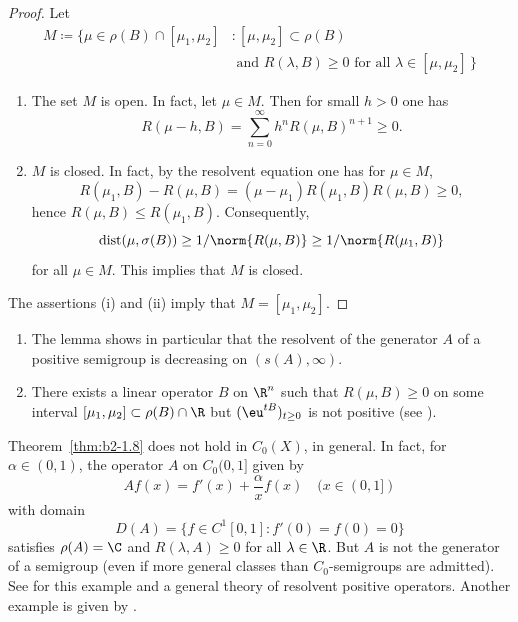 \begin{proof}
Let 
\begin{align*}
M \coloneqq \{\mu \in \rho(B) \cap [\mu_{1},\mu_{2}] &\colon [\mu,\mu_{2}] \subset \rho(B) \\
 &\text{ and } 
R(\lambda,B) \geq 0 \text{ for all } \lambda \in [\mu,\mu_{2}] \,\}
\end{align*}
\begin{enumerate}[\upshape (i), wide, labelindent=.25em]
	\item
	The set $M$ is open.
	In fact, let $\mu \in M$.
	Then for small $h > 0$ one has
	\[R(\mu-h,B) = \sum_{n=0}^{\infty} h^{n}R(\mu,B)^{n+1} \geq 0.\]
    \item 
 	$M$ is closed.
	In fact, by the resolvent equation one has for $\mu \in M$,  
\[
	R(\mu_{1},B) - R(\mu,B) = (\mu - \mu_{1})R(\mu_{1},B)R(\mu,B) \geq 0 ,
\]
%
hence $R(\mu,B) \leq R(\mu_{1},B)$.
	Consequently, 
\[
	\text{dist}(\mu,\sigma(B)) \geq 1/\norm{R(\mu,B)} \geq 1/\norm{R(\mu_{1},B)}
\]
%
for all $\mu \in M$.
This implies that $M$ is closed.
\end{enumerate}
The assertions (i) and (ii) imply that $M = [\mu_{1},\mu_{2}]$.
\end{proof}
\begin{remark*}\label{rem:b2-1.9-kgk1}
\begin{enumerate}[\upshape (i), wide, labelindent=.25em]  

\item \label{rem:b2-1.9-1}
The lemma shows in particular that the resolvent of the generator $A$ of a positive semigroup is decreasing on $(s(A),\infty)$.

\item \label{rem:b2-1.9-2}
There exists a linear operator $B$ on $\R^{n}$ such that $R(\mu,B) \geq 0$ on some interval $[\mu_{1},\mu_{2}] \subset \rho(B) \cap \R$ but $(\eu^{tB})_{t \geq 0}$ is not positive (see \textcite{greinervoigtwolff:1981}
).
\end{enumerate}
\end{remark*}

\begin{remark*}\label{rem:b2-1.9-kgk2}
Theorem~\ref{thm:b2-1.8} does not hold in $C_{0}(X)$, in general.
In fact, for $\alpha \in (0,1)$,  the operator $A$ on $C_{0}(0,1]$ given by 
\[
    Af(x) = f'(x) + \frac{\alpha}{x} f(x) \quad (x \in (0,1])
\]
with domain 
\[
D(A) = \{f \in C^{1}[0,1] \colon f'(0) = f(0) = 0\} 
\]
satisfies $\rho(A) = \C $ and 
$R(\lambda,A) \geq 0$ for all $\lambda \in \R$.
But $A$ is not the generator of a semigroup (even if more general classes than $C_{0}$-semigroups are admitted).
See \textcite{arendt:1987} 
for this example and a general theory of resolvent positive operators.
Another example is given by \textcite{battydavies:1983}.
\end{remark*}

